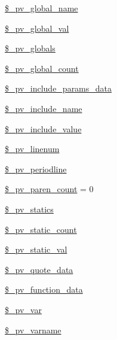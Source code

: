 \begin{DoxyCompactItemize}
\item 
\hyperlink{classphp_documentor_t_parser_a13ed0a1c207d4f0e7e42e2498b48c5b6}{\$\-\_\-pv\-\_\-global\-\_\-name}
\item 
\hyperlink{classphp_documentor_t_parser_a133cfbf7a3fc662f3e9c0721d54e8db4}{\$\-\_\-pv\-\_\-global\-\_\-val}
\item 
\hyperlink{classphp_documentor_t_parser_ae772f551d4f5aed2b37496d31c726b6a}{\$\-\_\-pv\-\_\-globals}
\item 
\hyperlink{classphp_documentor_t_parser_a2c4d1d75683450c5d5530aedcfca4ac2}{\$\-\_\-pv\-\_\-global\-\_\-count}
\item 
\hyperlink{classphp_documentor_t_parser_a1b269ebf6b132cc026642cced55fc2d6}{\$\-\_\-pv\-\_\-include\-\_\-params\-\_\-data}
\item 
\hyperlink{classphp_documentor_t_parser_a43e82b3771a8d6975aab39097932ef34}{\$\-\_\-pv\-\_\-include\-\_\-name}
\item 
\hyperlink{classphp_documentor_t_parser_a3149a82355e9e1d73ef60f307cf99a25}{\$\-\_\-pv\-\_\-include\-\_\-value}
\item 
\hyperlink{classphp_documentor_t_parser_a81261f6bf2747b597f20ba296f2af363}{\$\-\_\-pv\-\_\-linenum}
\item 
\hyperlink{classphp_documentor_t_parser_a645b480352e0c2703af564f29f269cfe}{\$\-\_\-pv\-\_\-periodline}
\item 
\hyperlink{classphp_documentor_t_parser_a2f75a91c7a96f879c676f2e87757f75a}{\$\-\_\-pv\-\_\-paren\-\_\-count} = 0
\item 
\hyperlink{classphp_documentor_t_parser_acdb2ae1a51ed7bacdff8ae9e96655d55}{\$\-\_\-pv\-\_\-statics}
\item 
\hyperlink{classphp_documentor_t_parser_af817a108d097c3533280746aea74a931}{\$\-\_\-pv\-\_\-static\-\_\-count}
\item 
\hyperlink{classphp_documentor_t_parser_aa1ab19abbf58b38a925e8b8f5714facb}{\$\-\_\-pv\-\_\-static\-\_\-val}
\item 
\hyperlink{classphp_documentor_t_parser_ae40ef7ffbfb8f2fd2225b6bcc7d3eb30}{\$\-\_\-pv\-\_\-quote\-\_\-data}
\item 
\hyperlink{classphp_documentor_t_parser_a2ee59569de2a32df0567b5b776d1970e}{\$\-\_\-pv\-\_\-function\-\_\-data}
\item 
\hyperlink{classphp_documentor_t_parser_a397800844a3257600e13926c3e1a9677}{\$\-\_\-pv\-\_\-var}
\item 
\hyperlink{classphp_documentor_t_parser_a17819733e12073fc86ff7a587faca0fd}{\$\-\_\-pv\-\_\-varname}

\end{DoxyCompactItemize}
